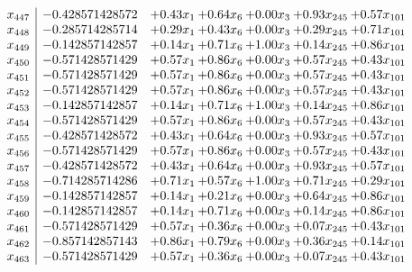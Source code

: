 \documentclass[8pt]{article}
\begin{document}
\[\begin{array}{c| c c@{\hskip 2pt} c@{\hskip 2pt} c@{\hskip 2pt} c@{\hskip 2pt} c@{\hskip 2pt} }
 x_{447}   &  -0.428571428572 & +  0.43 x_{1} & +  0.64 x_{6} & +  0.00 x_{3} & +  0.93 x_{245} & +  0.57 x_{101}\\
 x_{448}   &  -0.285714285714 & +  0.29 x_{1} & +  0.43 x_{6} & +  0.00 x_{3} & +  0.29 x_{245} & +  0.71 x_{101}\\
 x_{449}   &  -0.142857142857 & +  0.14 x_{1} & +  0.71 x_{6} & +  1.00 x_{3} & +  0.14 x_{245} & +  0.86 x_{101}\\
 x_{450}   &  -0.571428571429 & +  0.57 x_{1} & +  0.86 x_{6} & +  0.00 x_{3} & +  0.57 x_{245} & +  0.43 x_{101}\\
 x_{451}   &  -0.571428571429 & +  0.57 x_{1} & +  0.86 x_{6} & +  0.00 x_{3} & +  0.57 x_{245} & +  0.43 x_{101}\\
 x_{452}   &  -0.571428571429 & +  0.57 x_{1} & +  0.86 x_{6} & +  0.00 x_{3} & +  0.57 x_{245} & +  0.43 x_{101}\\
 x_{453}   &  -0.142857142857 & +  0.14 x_{1} & +  0.71 x_{6} & +  1.00 x_{3} & +  0.14 x_{245} & +  0.86 x_{101}\\
 x_{454}   &  -0.571428571429 & +  0.57 x_{1} & +  0.86 x_{6} & +  0.00 x_{3} & +  0.57 x_{245} & +  0.43 x_{101}\\
 x_{455}   &  -0.428571428572 & +  0.43 x_{1} & +  0.64 x_{6} & +  0.00 x_{3} & +  0.93 x_{245} & +  0.57 x_{101}\\
 x_{456}   &  -0.571428571429 & +  0.57 x_{1} & +  0.86 x_{6} & +  0.00 x_{3} & +  0.57 x_{245} & +  0.43 x_{101}\\
 x_{457}   &  -0.428571428572 & +  0.43 x_{1} & +  0.64 x_{6} & +  0.00 x_{3} & +  0.93 x_{245} & +  0.57 x_{101}\\
 x_{458}   &  -0.714285714286 & +  0.71 x_{1} & +  0.57 x_{6} & +  1.00 x_{3} & +  0.71 x_{245} & +  0.29 x_{101}\\
 x_{459}   &  -0.142857142857 & +  0.14 x_{1} & +  0.21 x_{6} & +  0.00 x_{3} & +  0.64 x_{245} & +  0.86 x_{101}\\
 x_{460}   &  -0.142857142857 & +  0.14 x_{1} & +  0.71 x_{6} & +  0.00 x_{3} & +  0.14 x_{245} & +  0.86 x_{101}\\
 x_{461}   &  -0.571428571429 & +  0.57 x_{1} & +  0.36 x_{6} & +  0.00 x_{3} & +  0.07 x_{245} & +  0.43 x_{101}\\
 x_{462}   &  -0.857142857143 & +  0.86 x_{1} & +  0.79 x_{6} & +  0.00 x_{3} & +  0.36 x_{245} & +  0.14 x_{101}\\
 x_{463}   &  -0.571428571429 & +  0.57 x_{1} & +  0.36 x_{6} & +  0.00 x_{3} & +  0.07 x_{245} & +  0.43 x_{101}\\

\end{array}\]
\end{document}
